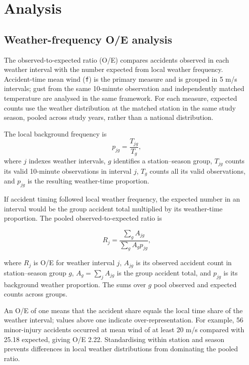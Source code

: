 

\section{Analysis}
\label{sec:analysis}

\subsection{Weather-frequency O/E analysis}
\label{sec:weather-frequency}

The observed-to-expected ratio (O/E) compares accidents observed in each
weather interval with the number expected from local weather frequency.
Accident-time mean wind (\texttt{f}) is the primary measure and is grouped in
5 m/s intervals; gust from the same 10-minute observation and independently
matched temperature are analysed in the same framework. For each measure,
expected counts use the weather distribution at the matched station in the same
study season, pooled across study years, rather than a national distribution.

The local background frequency is
\begin{equation}
\label{eq:weather-frequency}
p_{jg}=\frac{T_{jg}}{T_g},
\end{equation}
where \(j\) indexes weather intervals, \(g\) identifies a station--season group,
\(T_{jg}\) counts its valid 10-minute observations in interval \(j\),
\(T_g\) counts all its valid observations, and \(p_{jg}\) is the resulting
weather-time proportion.

If accident timing followed local weather frequency, the expected number in an
interval would be the group accident total multiplied by its weather-time
proportion. The pooled observed-to-expected ratio is

\begin{equation}
\label{eq:weather-oe}
R_j=
\frac{\sum_g A_{jg}}
     {\sum_g A_g p_{jg}},
\end{equation}

where \(R_j\) is O/E for weather interval \(j\), \(A_{jg}\) is its observed
accident count in station--season group \(g\), \(A_g=\sum_j A_{jg}\) is the
group accident total, and \(p_{jg}\) is its background weather proportion.
The sums over \(g\) pool observed and expected counts across groups.

An O/E of one means that the accident share equals the local time share of the
weather interval; values above one indicate over-representation. For example,
56 minor-injury accidents occurred at mean wind of at least 20 m/s compared
with 25.18 expected, giving O/E 2.22. Standardising within station and season prevents differences in local weather
distributions from dominating the pooled ratio.

